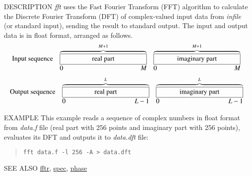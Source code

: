 \begin{synopsis}
\item[fft] [ --l $L$ ] [ --m $M$] [ --\{ A $|$ R $|$ I $|$ P \} ] 
	   [ {\em infile} ] 
\end{synopsis}

\begin{qsection}{DESCRIPTION}
{\em fft} uses the Fast Fourier Transform (FFT) algorithm 
to calculate the Discrete Fourier Transform (DFT) 
of complex-valued input data from {\em infile} (or standard input), 
sending the result to standard output. 
The input and output data is in float format, arranged as follows.
\[
 \begin{array}{lll}
\mbox{Input sequence} & \overbrace{\framebox[4.5cm]{real part}}^{M+1} &
	   \overbrace{\framebox[4.5cm]{imaginary part}}^{M+1} \\
		& \makebox[4.5cm]{0\hfill $M$} &
		\makebox[4.5cm]{0\hfill $M$}
\end{array}
\]
\[
\begin{array}{lll}
\mbox{Output sequence} & \overbrace{\framebox[4.5cm]{real part}}^{L} &
	   \overbrace{\framebox[4.5cm]{imaginary part}}^{L} \\
		& \makebox[4.5cm]{0\hfill $L-1$} &
		\makebox[4.5cm]{0\hfill $L-1$}
\end{array}
\]
\end{qsection}

\begin{options}
\end{options}

\begin{qsection}{EXAMPLE}
This example reads a sequence of complex numbers in float format from
{\em data.f} file (real part with 256 points and imaginary part with
256 points), evaluates its DFT and outputs it to {\em data.dft} file:
\begin{quote}
  \verb!fft data.f -l 256 -A > data.dft!
\end{quote}
\end{qsection}

\begin{qsection}{SEE ALSO}
\hyperlink{fftr}{fftr},
\hyperlink{spec}{spec},
\hyperlink{phase}{phase}
\end{qsection}
